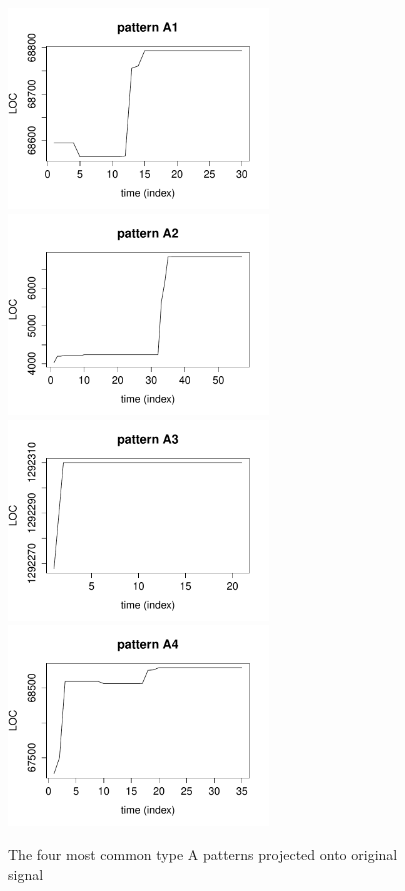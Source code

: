 \begin{figure}[H]
\caption{The four most common type A patterns projected onto original
signal}\label{figure:top_patterns_plots}
\centering
	\includegraphics[width=196pt]{images/pattern_a1.pdf}
	\hspace{1em}
	\includegraphics[width=196pt]{images/pattern_a2.pdf}
	\\
	\vspace{1em}
	\includegraphics[width=196pt]{images/pattern_a3.pdf}
	\hspace{1em}
	\includegraphics[width=196pt]{images/pattern_a4.pdf}
\end{figure}